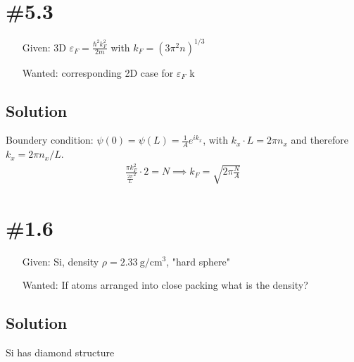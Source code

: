 \documentclass{article}
\begin{document}
\section*{\#5.3}
\begin{itemize}
    \item[Given:] 3D \(\varepsilon_F = \frac{\hbar^2k^2_F}{2m}\) with \(k_F = \left(3\pi^2n\right)^{1/3}\)
    \item[Wanted:] corresponding 2D case for \(\varepsilon_F\) k
\end{itemize}

\subsection*{Solution}
Boundery condition: \(\psi(0) = \psi(L) = \frac{1}{A} e^{ik_x}\), with \(k_x\cdot L = 2\pi n_x\) and  therefore \(k_x = 2\pi n_x/L\).
\begin{align}
    \frac{\pi k_F^2}{\frac{2\pi}{L}^2} \cdot 2 = N \implies k_F = \sqrt{2\pi \frac{N}{A}}
\end{align}

\section*{\#1.6}
\begin{itemize}
    \item[Given:] Si, density \(\rho = \SI{2.33}{\gram\per\centi\meter\cubed}\), "hard sphere"
    \item[Wanted:] If atoms arranged into close packing what is the density?
\end{itemize}

\subsection*{Solution}
Si has diamond structure
\end{document}
